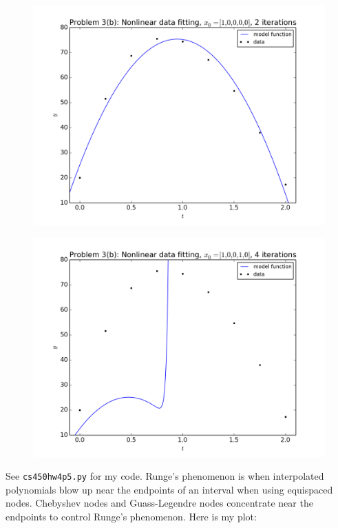 \documentclass[10pt]{article}
\begin{document}
\begin{itemize}
\begin{figure}[H]
  \centering
    \includegraphics[scale=0.9]{p3bfig2}
\end{figure}

\begin{figure}[H]
  \centering
    \includegraphics[scale=0.9]{p3bfig3}
\end{figure}

\end{itemize}


See \verb+cs450hw4p5.py+ for my code. Runge's phenomenon is when interpolated polynomials blow up near the endpoints of an interval when using equispaced nodes. Chebyshev nodes and Guass-Legendre nodes concentrate near the endpoints to control Runge's phenomenon. Here is my plot:
\end{document}
